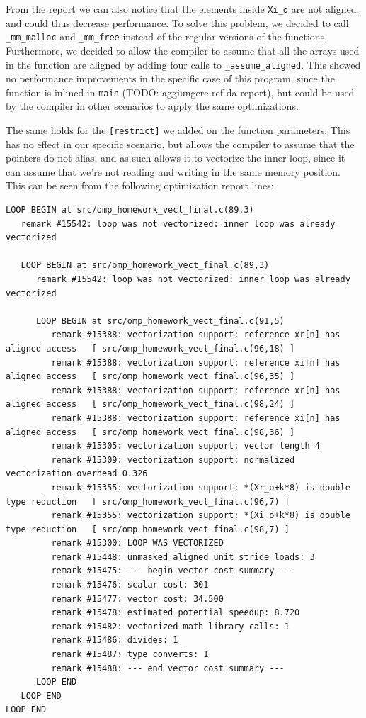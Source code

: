 \documentclass{article}
\begin{document}
From the report we can also notice that the elements inside \verb|Xi_o| are not aligned, and could thus decrease performance. To solve this problem, we decided to call \verb|_mm_malloc| and \verb|_mm_free| instead of the regular versions of the functions. Furthermore, we decided to allow the compiler to assume that all the arrays used in the function are aligned by adding four calls to \verb|_assume_aligned|. This showed no performance improvements in the specific case of this program, since the function is inlined in \verb|main| (TODO: aggiungere ref da report), but could be used by the compiler in other scenarios to apply the same optimizations.

The same holds for the \verb|[restrict]| we added on the function parameters. This has no effect in our specific scenario, but allows the compiler to assume that the pointers do not alias, and as such allows it to vectorize the inner loop, since it can assume that we're not reading and writing in the same memory position. This can be seen from the following optimization report lines:
\begin{verbatim}
LOOP BEGIN at src/omp_homework_vect_final.c(89,3)
   remark #15542: loop was not vectorized: inner loop was already vectorized

   LOOP BEGIN at src/omp_homework_vect_final.c(89,3)
      remark #15542: loop was not vectorized: inner loop was already vectorized

      LOOP BEGIN at src/omp_homework_vect_final.c(91,5)
         remark #15388: vectorization support: reference xr[n] has aligned access   [ src/omp_homework_vect_final.c(96,18) ]
         remark #15388: vectorization support: reference xi[n] has aligned access   [ src/omp_homework_vect_final.c(96,35) ]
         remark #15388: vectorization support: reference xr[n] has aligned access   [ src/omp_homework_vect_final.c(98,24) ]
         remark #15388: vectorization support: reference xi[n] has aligned access   [ src/omp_homework_vect_final.c(98,36) ]
         remark #15305: vectorization support: vector length 4
         remark #15309: vectorization support: normalized vectorization overhead 0.326
         remark #15355: vectorization support: *(Xr_o+k*8) is double type reduction   [ src/omp_homework_vect_final.c(96,7) ]
         remark #15355: vectorization support: *(Xi_o+k*8) is double type reduction   [ src/omp_homework_vect_final.c(98,7) ]
         remark #15300: LOOP WAS VECTORIZED
         remark #15448: unmasked aligned unit stride loads: 3 
         remark #15475: --- begin vector cost summary ---
         remark #15476: scalar cost: 301 
         remark #15477: vector cost: 34.500 
         remark #15478: estimated potential speedup: 8.720 
         remark #15482: vectorized math library calls: 1 
         remark #15486: divides: 1 
         remark #15487: type converts: 1 
         remark #15488: --- end vector cost summary ---
      LOOP END
   LOOP END
LOOP END
\end{verbatim}
\end{document}
